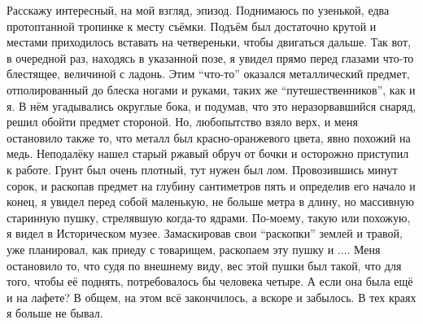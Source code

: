 Расскажу интересный, на мой взгляд, эпизод. Поднимаюсь по узенькой, едва
протоптанной тропинке к месту съёмки. Подъём был достаточно крутой и местами
приходилось вставать на четвереньки, чтобы двигаться дальше. Так вот, в
очередной раз, находясь в указанной позе, я увидел прямо перед глазами что-то
блестящее, величиной с ладонь. Этим \enquote{что-то} оказался металлический предмет,
отполированный до блеска ногами и руками, таких же \enquote{путешественников}, как и я.
В нём угадывались округлые бока, и подумав, что это неразорвавшийся снаряд,
решил обойти предмет стороной. Но, любопытство взяло верх, и меня остановило
также то, что металл был красно-оранжевого цвета, явно похожий на медь.
Неподалёку нашел старый ржавый обруч от бочки и осторожно приступил к работе.
Грунт был очень плотный, тут нужен был лом. Провозившись минут сорок, и
раскопав предмет на глубину сантиметров пять и определив его начало и конец, я
увидел перед собой маленькую, не больше метра в длину, но массивную старинную
пушку, стрелявшую когда-то ядрами. По-моему, такую или похожую, я видел в
Историческом музее. Замаскировав свои \enquote{раскопки} землей и травой, уже
планировал, как приеду с товарищем, раскопаем эту пушку и .... Меня остановило
то, что судя по внешнему виду, вес этой пушки был такой, что для того, чтобы её
поднять, потребовалось бы человека четыре. А если она была ещё и на лафете? В
общем, на этом всё закончилось, а вскоре и забылось. В тех краях я больше не
бывал.

